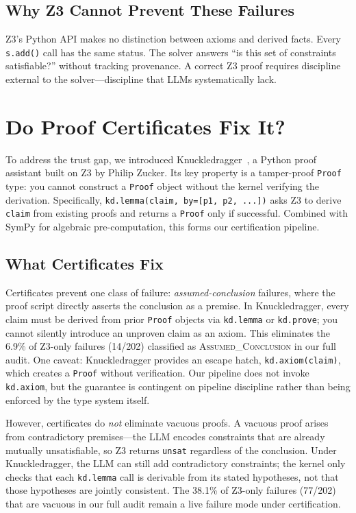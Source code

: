 \documentclass[11pt]{article}
\begin{document}
\subsection{Why Z3 Cannot Prevent These Failures}

Z3's Python API makes no distinction between axioms and derived facts. Every \texttt{s.add()} call has the same status. The solver answers ``is this set of constraints satisfiable?'' without tracking provenance. A correct Z3 proof requires discipline external to the solver---discipline that LLMs systematically lack.

\section{Do Proof Certificates Fix It?}\label{sec:certificates}

To address the trust gap, we introduced Knuckledragger~\cite{knuckledragger2026}, a Python proof assistant built on Z3 by Philip Zucker. Its key property is a tamper-proof \texttt{Proof} type: you cannot construct a \texttt{Proof} object without the kernel verifying the derivation. Specifically, \texttt{kd.lemma(claim, by=[p1, p2, ...])} asks Z3 to derive \texttt{claim} from existing proofs and returns a \texttt{Proof} only if successful. Combined with SymPy for algebraic pre-computation, this forms our certification pipeline.

\subsection{What Certificates Fix}

Certificates prevent one class of failure: \emph{assumed-conclusion} failures, where the proof script directly asserts the conclusion as a premise. In Knuckledragger, every claim must be derived from prior \texttt{Proof} objects via \texttt{kd.lemma} or \texttt{kd.prove}; you cannot silently introduce an unproven claim as an axiom. This eliminates the 6.9\% of Z3-only failures (14/202) classified as \textsc{Assumed\_Conclusion} in our full audit. One caveat: Knuckledragger provides an escape hatch, \texttt{kd.axiom(claim)}, which creates a \texttt{Proof} without verification. Our pipeline does not invoke \texttt{kd.axiom}, but the guarantee is contingent on pipeline discipline rather than being enforced by the type system itself.

However, certificates do \emph{not} eliminate vacuous proofs. A vacuous proof arises from contradictory premises---the LLM encodes constraints that are already mutually unsatisfiable, so Z3 returns \texttt{unsat} regardless of the conclusion. Under Knuckledragger, the LLM can still add contradictory constraints; the kernel only checks that each \texttt{kd.lemma} call is derivable from its stated hypotheses, not that those hypotheses are jointly consistent. The 38.1\% of Z3-only failures (77/202) that are vacuous in our full audit remain a live failure mode under certification.
\end{document}
